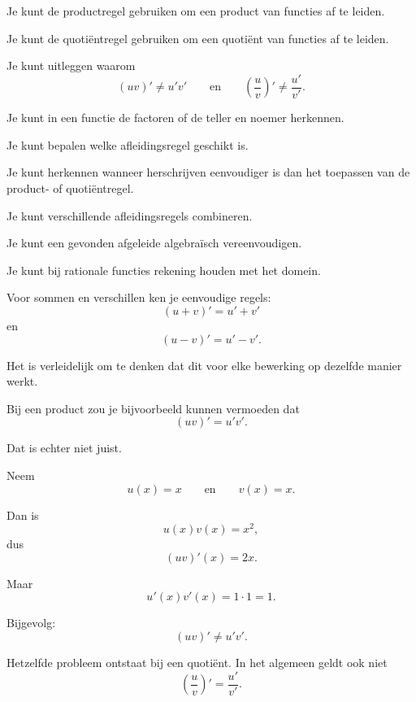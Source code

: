 \documentclass{ximera}
\begin{document}
\begin{leerdoelen}
  \item Je kunt de productregel gebruiken om een product van functies af te leiden.
  \item Je kunt de quotiëntregel gebruiken om een quotiënt van functies af te leiden.
  \item Je kunt uitleggen waarom
        \[
        (uv)'\neq u'v'
        \qquad\text{en}\qquad
        \left(\frac{u}{v}\right)'\neq\frac{u'}{v'}.
        \]
  \item Je kunt in een functie de factoren of de teller en noemer herkennen.
  \item Je kunt bepalen welke afleidingsregel geschikt is.
  \item Je kunt herkennen wanneer herschrijven eenvoudiger is dan het toepassen
        van de product- of quotiëntregel.
  \item Je kunt verschillende afleidingsregels combineren.
  \item Je kunt een gevonden afgeleide algebraïsch vereenvoudigen.
  \item Je kunt bij rationale functies rekening houden met het domein.
\end{leerdoelen}



Voor sommen en verschillen ken je eenvoudige regels:
\[
(u+v)'=u'+v'
\]
en
\[
(u-v)'=u'-v'.
\]

Het is verleidelijk om te denken dat dit voor elke bewerking op dezelfde
manier werkt.

Bij een product zou je bijvoorbeeld kunnen vermoeden dat
\[
(uv)'=u'v'.
\]

Dat is echter niet juist.

\begin{voorbeeld}
Neem
\[
u(x)=x
\qquad\text{en}\qquad
v(x)=x.
\]

Dan is
\[
u(x)v(x)=x^2,
\]
dus
\[
(uv)'(x)=2x.
\]

Maar
\[
u'(x)v'(x)=1\cdot1=1.
\]

Bijgevolg:
\[
(uv)'\neq u'v'.
\]
\end{voorbeeld}

Hetzelfde probleem ontstaat bij een quotiënt. In het algemeen geldt ook
niet
\[
\left(\frac{u}{v}\right)'=\frac{u'}{v'}.
\]
\end{document}
